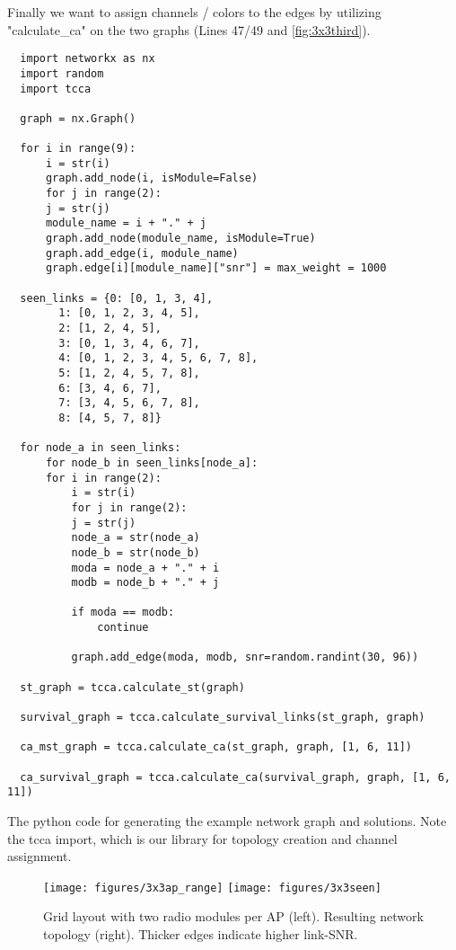     Finally we want to assign channels / colors to the edges by utilizing "calculate\_ca" on the two graphs (Lines 47/49 and \ref{fig:3x3third}).
    
    \newpage
    
    \begin{table}[h!]
    \lstset{language=Python}
    \begin{lstlisting}
  import networkx as nx
  import random
  import tcca

  graph = nx.Graph()

  for i in range(9):
      i = str(i)
      graph.add_node(i, isModule=False)
      for j in range(2):
	  j = str(j)
	  module_name = i + "." + j
	  graph.add_node(module_name, isModule=True)
	  graph.add_edge(i, module_name)
	  graph.edge[i][module_name]["snr"] = max_weight = 1000

  seen_links = {0: [0, 1, 3, 4], 
		1: [0, 1, 2, 3, 4, 5], 
		2: [1, 2, 4, 5], 
		3: [0, 1, 3, 4, 6, 7], 
		4: [0, 1, 2, 3, 4, 5, 6, 7, 8], 
		5: [1, 2, 4, 5, 7, 8], 
		6: [3, 4, 6, 7], 
		7: [3, 4, 5, 6, 7, 8], 
		8: [4, 5, 7, 8]}

  for node_a in seen_links:
      for node_b in seen_links[node_a]:
	  for i in range(2):
	      i = str(i)
	      for j in range(2):
		  j = str(j)
		  node_a = str(node_a)
		  node_b = str(node_b)
		  moda = node_a + "." + i
		  modb = node_b + "." + j

		  if moda == modb:
		      continue

		  graph.add_edge(moda, modb, snr=random.randint(30, 96))

  st_graph = tcca.calculate_st(graph)

  survival_graph = tcca.calculate_survival_links(st_graph, graph)

  ca_mst_graph = tcca.calculate_ca(st_graph, graph, [1, 6, 11])

  ca_survival_graph = tcca.calculate_ca(survival_graph, graph, [1, 6, 11])
    \end{lstlisting}
    \caption{The python code for generating the example network graph and solutions. Note the tcca import, 
      which is our library for topology creation and channel assignment.}
    \label{tab:python-example}
  \end{table}
  
  \newpage
  
    \begin{figure}[h!]
      \centering
      \texttt{[image: figures/3x3ap\_range]}
      \texttt{[image: figures/3x3seen]}
      \caption{Grid layout with two radio modules per \ac{AP} (left). Resulting network topology (right). Thicker edges indicate higher link-SNR.}
      \label{fig:3x3initial}
    \end{figure}
    

